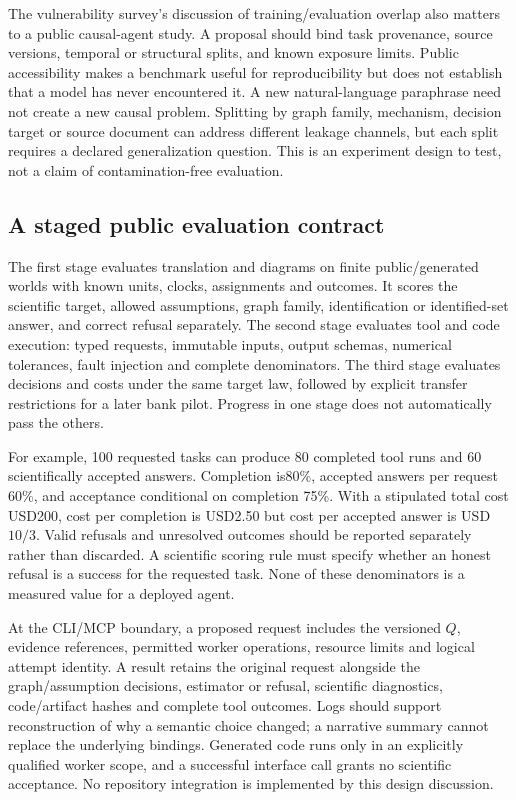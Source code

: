 The vulnerability survey's discussion of training/evaluation overlap also matters to a public causal-agent study. A proposal should bind task provenance, source versions, temporal or structural splits, and known exposure limits. Public accessibility makes a benchmark useful for reproducibility but does not establish that a model has never encountered it. A new natural-language paraphrase need not create a new causal problem. Splitting by graph family, mechanism, decision target or source document can address different leakage channels, but each split requires a declared generalization question. This is an experiment design to test, not a claim of contamination-free evaluation.\citep{exec25_cow_vulnerability,exec25_cow_reference}

\subsection{A staged public evaluation contract}

The first stage evaluates translation and diagrams on finite public/generated worlds with known units, clocks, assignments and outcomes. It scores the scientific target, allowed assumptions, graph family, identification or identified-set answer, and correct refusal separately. The second stage evaluates tool and code execution: typed requests, immutable inputs, output schemas, numerical tolerances, fault injection and complete denominators. The third stage evaluates decisions and costs under the same target law, followed by explicit transfer restrictions for a later bank pilot. Progress in one stage does not automatically pass the others.\citep{exec25_cow_reference}

For example, 100 requested tasks can produce 80 completed tool runs and 60 scientifically accepted answers. Completion is80\%, accepted answers per request 60\%, and acceptance conditional on completion 75\%. With a stipulated total cost USD200, cost per completion is USD2.50 but cost per accepted answer is USD$10/3$. Valid refusals and unresolved outcomes should be reported separately rather than discarded. A scientific scoring rule must specify whether an honest refusal is a success for the requested task. None of these denominators is a measured value for a deployed agent.\citep{exec25_cow_reference}

At the CLI/MCP boundary, a proposed request includes the versioned $Q$, evidence references, permitted worker operations, resource limits and logical attempt identity. A result retains the original request alongside the graph/assumption decisions, estimator or refusal, scientific diagnostics, code/artifact hashes and complete tool outcomes. Logs should support reconstruction of why a semantic choice changed; a narrative summary cannot replace the underlying bindings. Generated code runs only in an explicitly qualified worker scope, and a successful interface call grants no scientific acceptance. No repository integration is implemented by this design discussion.\citep{exec25_cow_reference}

